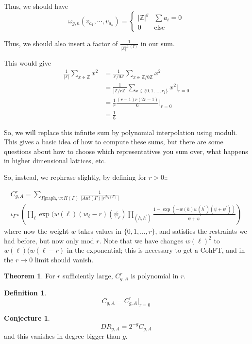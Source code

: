 \documentclass{amsart}
\theoremstyle{definition}
\newtheorem{theorem}{Theorem}
\newtheorem{definition}{Definition}
\newtheorem{conjecture}{Conjecture}
\newcommand{\Z}{\mathbb{Z}}
\newcommand{\Aut}{Aut}
\begin{document}
Thus, we should have
$$\omega_{g,n}(v_{a_1}, \cdots, v_{a_n})=\left\{\begin{array}{ll} |\Z|^g & \sum a_i=0 \\ 0 & \text{else}
\end{array}\right.
$$

Thus, we should also insert a factor of $\frac{1}{|\Z|^{h_1(\Gamma)}}$ in our sum.

This would give
\begin{align*}
\frac{1}{|\Z|}\sum_{x\in\Z} x^2&=\frac{1}{\Z/0\Z}\sum_{x\in\Z/0\Z} x^2 \\
&=\frac{1}{|\Z/r\Z|} \sum_{x\in \{0,1,\dots, r_1\}} x^2 |_{r=0} \\
&=\frac{1}{r}\frac{(r-1)r(2r-1)}{6}|_{r=0} \\
&=\frac{1}{6}
\end{align*}

So, we will replace this infinite sum by polynomial interpolation using moduli.  This gives a basic idea of how to compute these sums, but there are some questions about how to choose which representatives you sum over, what happens in higher dimensional lattices, etc.

So, instead, we rephrase slightly, by defining for $r>0$::

 \begin{multline*}
C^r_{g,A}=\sum_{\Gamma \text{graph}, w:H(\Gamma)}\frac{1}{|\Aut(\Gamma)|r^{|h_1(\Gamma)}|}\\
 \iota_{\Gamma*}\left( \prod_{\ell} \exp(w(\ell)(w_\ell-r)(\psi_\ell) \prod_{(h,h^\prime)} \frac{1-\exp(-w(h)w(h^\prime)(\psi+\psi^\prime))}{\psi+\psi^\prime}\right) 
\end{multline*}
where now the weight $w$ takes values in $\{0,1,\dots,r\}$, and satisfies the restraints we had before, but now only mod $r$.  Note that we have changes $w(\ell)^2$ to $w(\ell)(w(\ell-r)$ in the exponential; this is necessary to get a CohFT, and in the $r\to 0$ limit should vanish.


\begin{theorem}
For $r$ sufficiently large, $C_{g,A}^r$ is polynomial in $r$.
\end{theorem}

\begin{definition}
$$C_{g,A}=C^r_{g,A}|_{r=0}$$
\end{definition}

\begin{conjecture}
$$DR_{g,A}=2^{-g} C_{g,A}$$
and this vanishes in degree bigger than $g$.
\end{conjecture}
\end{document}
